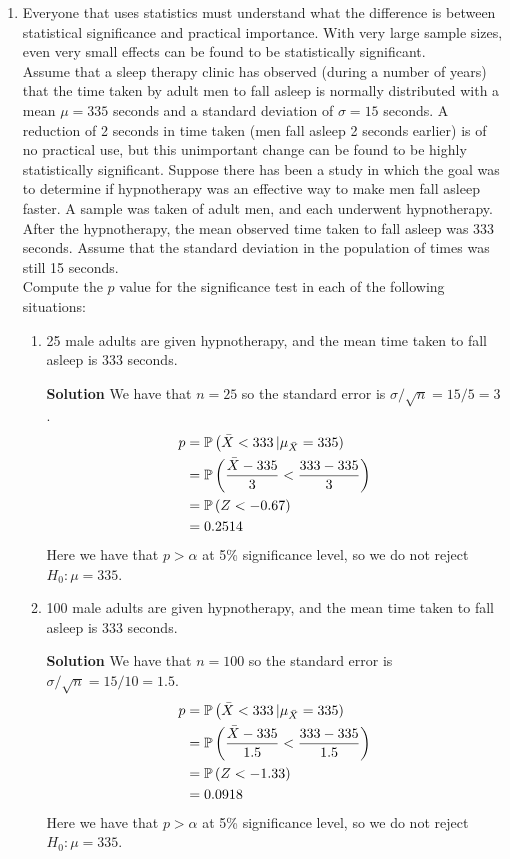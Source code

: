 \begin{enumerate}
    \item Everyone that uses statistics must understand what the difference is between statistical significance and practical importance. With very large sample sizes, even very small effects can be found to be statistically significant. 
    \\
    Assume that a sleep therapy clinic has observed (during a number of years) that the time taken by adult men to fall asleep is normally distributed with a mean $\mu = 335$ seconds and a standard deviation of $\sigma = 15$ seconds. A reduction of 2 seconds in time taken (men fall asleep 2 seconds earlier) is of no practical use, but this unimportant change can be found to be highly statistically significant. Suppose there has been a study in which the goal was to determine if hypnotherapy was an effective way to make men fall asleep faster. A sample was taken of adult men, and each underwent hypnotherapy. After the hypnotherapy, the mean observed time taken to fall asleep was 333 seconds. Assume that the standard deviation in the population of times was still 15 seconds.
    \\
    Compute the $p$ value for the significance test in each of the following situations:
    \begin{enumerate}
        \item 25 male adults are given hypnotherapy, and the mean time taken to fall asleep is 333 seconds.
        \begin{framed}{\textbf{Solution}}
        We have that $n=25$ so the standard error is $\sigma/\sqrt{n} = 15/5=3$. 
        \begin{align}
            p &= \operatorname{\mathbb{P}}{\left( \bar{X}<333 \left| \mu_{\bar{X}} = 335 \right) \right. } \\
            &= \operatorname{\mathbb{P}}{\left( \frac{\bar{X} - 335}{3} < \frac{333-335}{3}\right)} \\
            &= \operatorname{\mathbb{P}}{\left( Z< -0.67\right)} \\
            &= 0.2514
        \end{align}
        Here we have that $p>\alpha$ at 5\% significance level, so we do not reject $H_0: \mu = 335$.
        \end{framed}
        
        \item 100 male adults are given hypnotherapy, and the mean time taken to fall asleep is 333 seconds.
        \begin{framed}{\textbf{Solution}}
        We have that $n=100$ so the standard error is $\sigma/\sqrt{n} = 15/10=1.5$. 
        \begin{align}
            p &= \operatorname{\mathbb{P}}{\left( \bar{X}<333 \left| \mu_{\bar{X}} = 335 \right) \right. } \\
            &= \operatorname{\mathbb{P}}{\left( \frac{\bar{X} - 335}{1.5} < \frac{333-335}{1.5}\right)} \\
            &= \operatorname{\mathbb{P}}{\left( Z< -1.33\right)} \\
            &= 0.0918
        \end{align}
        Here we have that $p>\alpha$ at 5\% significance level, so we do not reject $H_0: \mu = 335$.
        \end{framed}
        

\end{enumerate}
\end{enumerate}
